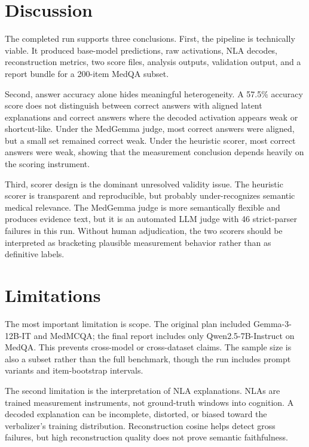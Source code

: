 \documentclass{article}
\begin{document}
\section{Discussion}

The completed run supports three conclusions. First, the pipeline is technically viable. It produced base-model predictions, raw activations, NLA decodes, reconstruction metrics, two score files, analysis outputs, validation output, and a report bundle for a 200-item MedQA subset.

Second, answer accuracy alone hides meaningful heterogeneity. A 57.5\% accuracy score does not distinguish between correct answers with aligned latent explanations and correct answers where the decoded activation appears weak or shortcut-like. Under the MedGemma judge, most correct answers were aligned, but a small set remained correct weak. Under the heuristic scorer, most correct answers were weak, showing that the measurement conclusion depends heavily on the scoring instrument.

Third, scorer design is the dominant unresolved validity issue. The heuristic scorer is transparent and reproducible, but probably under-recognizes semantic medical relevance. The MedGemma judge is more semantically flexible and produces evidence text, but it is an automated LLM judge with 46 strict-parser failures in this run. Without human adjudication, the two scorers should be interpreted as bracketing plausible measurement behavior rather than as definitive labels.

\section{Limitations}

The most important limitation is scope. The original plan included Gemma-3-12B-IT and MedMCQA; the final report includes only Qwen2.5-7B-Instruct on MedQA. This prevents cross-model or cross-dataset claims. The sample size is also a subset rather than the full benchmark, though the run includes prompt variants and item-bootstrap intervals.

The second limitation is the interpretation of NLA explanations. NLAs are trained measurement instruments, not ground-truth windows into cognition. A decoded explanation can be incomplete, distorted, or biased toward the verbalizer's training distribution. Reconstruction cosine helps detect gross failures, but high reconstruction quality does not prove semantic faithfulness.
\end{document}
